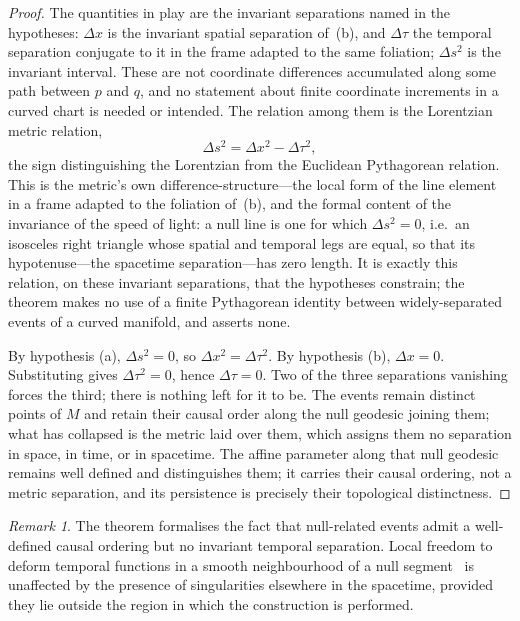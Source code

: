 \documentclass[11pt,a4paper]{article}
\theoremstyle{plain}
\theoremstyle{remark}
\newtheorem{remark}{Remark}
\begin{document}
\begin{proof}
The quantities in play are the invariant separations named in the hypotheses: $\Delta x$ is the invariant spatial separation of~(b), and $\Delta\tau$ the temporal separation conjugate to it in the frame adapted to the same foliation; $\Delta s^2$ is the invariant interval. These are not coordinate differences accumulated along some path between $p$ and $q$, and no statement about finite coordinate increments in a curved chart is needed or intended. The relation among them is the Lorentzian metric relation,
\[
\Delta s^2 = \Delta x^2 - \Delta\tau^2,
\]
the sign distinguishing the Lorentzian from the Euclidean Pythagorean relation. This is the metric's own difference-structure---the local form of the line element in a frame adapted to the foliation of~(b), and the formal content of the invariance of the speed of light: a null line is one for which $\Delta s^2=0$, i.e.\ an isosceles right triangle whose spatial and temporal legs are equal, so that its hypotenuse---the spacetime separation---has zero length. It is exactly this relation, on these invariant separations, that the hypotheses constrain; the theorem makes no use of a finite Pythagorean identity between widely-separated events of a curved manifold, and asserts none.

By hypothesis (a), $\Delta s^2=0$, so $\Delta x^2=\Delta\tau^2$. By hypothesis (b), $\Delta x=0$. Substituting gives $\Delta\tau^2=0$, hence $\Delta\tau=0$. Two of the three separations vanishing forces the third; there is nothing left for it to be. The events remain distinct points of $M$ and retain their causal order along the null geodesic joining them; what has collapsed is the metric laid over them, which assigns them no separation in space, in time, or in spacetime. The affine parameter along that null geodesic remains well defined and distinguishes them; it carries their causal ordering, not a metric separation, and its persistence is precisely their topological distinctness.
\end{proof}

\begin{remark}
The theorem formalises the fact that null-related events admit a well-defined causal ordering but no invariant temporal separation. Local freedom to deform temporal functions in a smooth neighbourhood of a null segment~\cite{BernalSanchez2005} is unaffected by the presence of singularities elsewhere in the spacetime, provided they lie outside the region in which the construction is performed.
\end{remark}
\end{document}
